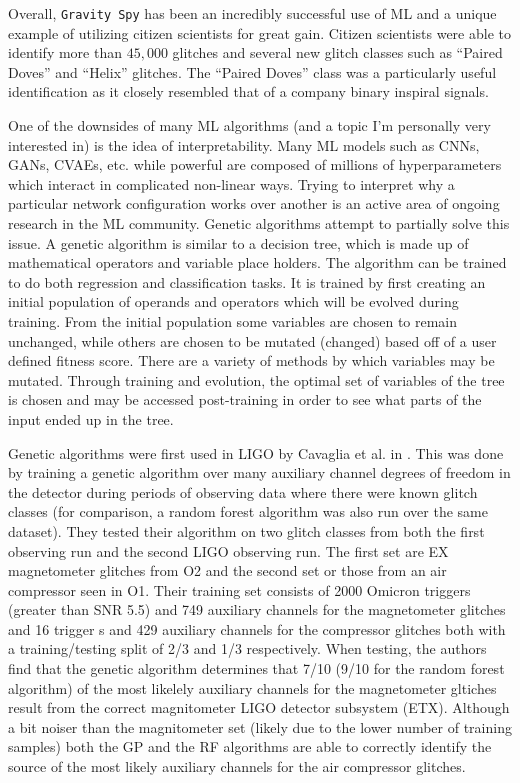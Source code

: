 %
%

Overall, \texttt{Gravity Spy} has been an incredibly successful use of \ac{ML} and a unique example of utilizing citizen scientists for great gain. Citizen scientists were able to identify more than $45,000$ glitches and several new glitch classes such as ``Paired Doves'' and ``Helix'' glitches. The ``Paired Doves'' class was a particularly useful identification as it closely resembled that of a company binary inspiral signals. 

%
%

One of the downsides of many \ac{ML} algorithms (and a topic I'm personally very interested in) is the idea of interpretability. Many \ac{ML} models such as \ac{CNN}s, \ac{GAN}s, \ac{CVAE}s, etc. while powerful are composed of millions of hyperparameters which interact in complicated non-linear ways. Trying to interpret why a particular network configuration works over another is an active area of ongoing research in the \ac{ML} community. Genetic algorithms attempt to partially solve this issue. A genetic algorithm is similar to a decision tree, which is made up of mathematical operators and variable place holders. The algorithm can be trained to do both regression and classification tasks. It is trained by first creating an initial population of operands and operators which will be evolved during training. From the initial population some variables are chosen to remain unchanged, while others are chosen to be mutated (changed) based off of a user defined fitness score. There are a variety of methods by which variables may be mutated. Through training and evolution, the optimal set of variables of the tree is chosen and may be accessed post-training in order to see what parts of the input ended up in the tree. 

%
%
Genetic algorithms were first used in \ac{LIGO} by Cavaglia et al. in \cite{CiCP-25-963}. This was done by training a genetic algorithm over many auxiliary channel degrees of freedom in the detector during periods of observing data where there were known glitch classes (for comparison, a random forest algorithm was also run over the same dataset). They tested their algorithm on two glitch classes from both the first observing run and the second \ac{LIGO} observing run. The first set are EX magnetometer glitches from O2 and the second set or those from an air compressor seen in O1. Their training set consists of 2000 Omicron triggers (greater than SNR 5.5) and 749 auxiliary channels for the magnetometer glitches and 16 trigger s and 429 auxiliary channels for the compressor glitches both with a training/testing split of 2/3 and 1/3 respectively. When testing, the authors find that the genetic algorithm determines that 7/10 (9/10 for the random forest algorithm) of the most likelely auxiliary channels for the magnetometer gltiches result from the correct magnitometer \ac{LIGO} detector subsystem (ETX). Although a bit noiser than the magnitometer set (likely due to the lower number of training samples) both the GP and the RF algorithms are able to correctly identify the source of the most likely auxiliary channels for the air compressor glitches. 

